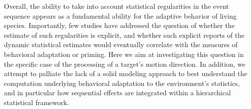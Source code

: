\documentclass[10pt,letterpaper]{article}
\begin{document}
Overall, the ability to take into account
statistical regularities in the event sequence appears as a fundamental ability
for the adaptive behavior of living species.
Importantly, few studies have addressed the question of whether
the estimate of such regularities is explicit,
and whether such explicit reports of the dynamic statistical
estimates would eventually correlate with the measures of behavioral adaptation or priming.
Here we aim at investigating this question
in the specific case of the  processing of a target's motion direction.
In addition, we attempt to palliate the lack of a solid modeling approach
to best understand the computation underlying behavioral adaptation to the environment's statistics,
and in particular how sequential effects are integrated
within a hierarchical statistical framework.
\end{document}
